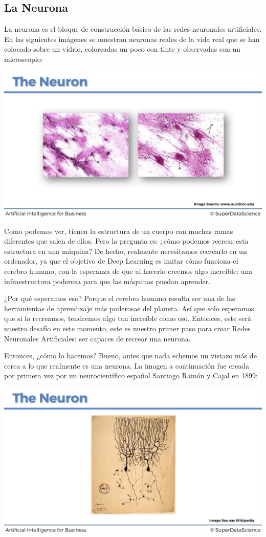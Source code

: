 \documentclass[
]{book}
\begin{document}
\hypertarget{la-neurona}{%
\subsection{La Neurona}\label{la-neurona}}

La neurona es el bloque de construcción básico de las redes neuronales artificiales. En las siguientes imágenes se muestran neuronas reales de la vida real que se han colocado sobre un vidrio, coloreadas un poco con tinte y observadas con un microscopio:

\includegraphics{Images/ANN_1.png}

Como podemos ver, tienen la estructura de un cuerpo con muchas ramas diferentes que salen de ellos. Pero la pregunta es: ¿cómo podemos recrear esta estructura en una máquina? De hecho, realmente necesitamos recrearlo en un ordenador, ya que el objetivo de Deep Learning es imitar cómo funciona el cerebro humano, con la esperanza de que al hacerlo creemos algo increíble: una infraestructura poderosa para que las máquinas puedan aprender.

¿Por qué esperamos eso? Porque el cerebro humano resulta ser una de las herramientas de aprendizaje más poderosas del planeta. Así que solo esperamos que si lo recreamos, tendremos algo tan increíble como eso. Entonces, este será nuestro desafío en este momento, este es nuestro primer paso para crear Redes Neuronales Artificiales: ser capaces de recrear una neurona.

Entonces, ¿cómo lo hacemos? Bueno, antes que nada echemos un vistazo más de cerca a lo que realmente es una neurona. La imagen a continuación fue creada por primera vez por un neurocientífico español Santiago Ramón y Cajal en 1899:

\includegraphics{Images/ANN_2.png}
\end{document}
